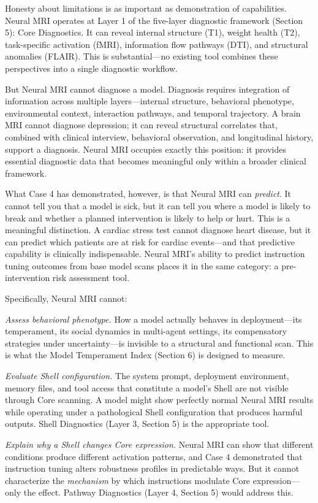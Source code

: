 \documentclass[11pt]{article}
\begin{document}
Honesty about limitations is as important as demonstration of capabilities. Neural MRI operates at Layer 1 of the five-layer diagnostic framework (Section 5): Core Diagnostics. It can reveal internal structure (T1), weight health (T2), task-specific activation (fMRI), information flow pathways (DTI), and structural anomalies (FLAIR). This is substantial---no existing tool combines these perspectives into a single diagnostic workflow.

But Neural MRI cannot diagnose a model. Diagnosis requires integration of information across multiple layers---internal structure, behavioral phenotype, environmental context, interaction pathways, and temporal trajectory. A brain MRI cannot diagnose depression; it can reveal structural correlates that, combined with clinical interview, behavioral observation, and longitudinal history, support a diagnosis. Neural MRI occupies exactly this position: it provides essential diagnostic data that becomes meaningful only within a broader clinical framework.

What Case 4 has demonstrated, however, is that Neural MRI can \emph{predict}. It cannot tell you that a model is sick, but it can tell you where a model is likely to break and whether a planned intervention is likely to help or hurt. This is a meaningful distinction. A cardiac stress test cannot diagnose heart disease, but it can predict which patients are at risk for cardiac events---and that predictive capability is clinically indispensable. Neural MRI's ability to predict instruction tuning outcomes from base model scans places it in the same category: a pre-intervention risk assessment tool.

Specifically, Neural MRI cannot:

\emph{Assess behavioral phenotype.} How a model actually behaves in deployment---its temperament, its social dynamics in multi-agent settings, its compensatory strategies under uncertainty---is invisible to a structural and functional scan. This is what the Model Temperament Index (Section 6) is designed to measure.

\emph{Evaluate Shell configuration.} The system prompt, deployment environment, memory files, and tool access that constitute a model's Shell are not visible through Core scanning. A model might show perfectly normal Neural MRI results while operating under a pathological Shell configuration that produces harmful outputs. Shell Diagnostics (Layer 3, Section 5) is the appropriate tool.

\emph{Explain why a Shell changes Core expression.} Neural MRI can show that different conditions produce different activation patterns, and Case 4 demonstrated that instruction tuning alters robustness profiles in predictable ways. But it cannot characterize the \emph{mechanism} by which instructions modulate Core expression---only the effect. Pathway Diagnostics (Layer 4, Section 5) would address this.
\end{document}
